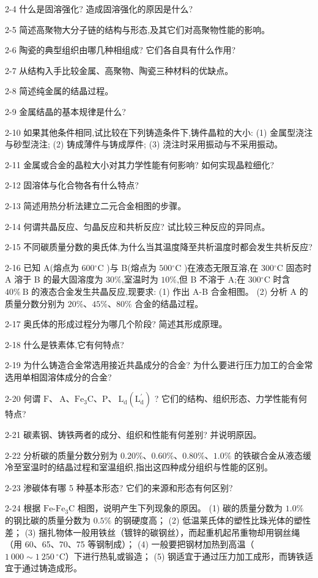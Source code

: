 \documentclass[UTF8]{ctexbook}
\newcommand{\◎}{\ensuremath{\bigcirc}}
\begin{document}
2-4 什么是固溶强化? 造成固溶强化的原因是什么?

2-5 简述高聚物大分子链的结构与形态,及其它们对高聚物性能的影响。

2-6 陶瓷的典型组织由哪几种相组成? 它们各自具有什么作用?

2-7 从结构入手比较金属、高聚物、陶瓷三种材料的优缺点。

2-8 简述纯金属的结晶过程。

2-9 金属结晶的基本规律是什么?

2-10 如果其他条件相同,试比较在下列铸造条件下,铸件晶粒的大小:
(1) 金属型浇注与砂型浇注;
(2) 铸成薄件与铸成厚件;
(3) 浇注时采用振动与不采用振动。

2-11 金属或合金的晶粒大小对其力学性能有何影响? 如何实现晶粒细化?

2-12 固溶体与化合物各有什么特点?

2-13 简述用热分析法建立二元合金相图的步骤。

2-14 何谓共晶反应、匀晶反应和共析反应? 试比较三种反应的异同点。

2-15 不同碳质量分数的奥氏体,为什么当其温度降至共析温度时都会发生共析反应?

2-16 已知 A(熔点为 $600{ }^{\circ} \mathrm{C}$ )与 B(熔点为 $500{ }^{\circ} \mathrm{C}$ )在液态无限互溶,在 $300{ }^{\circ} \mathrm{C}$ 固态时 A 溶于 B 的最大固溶度为 $30 \%$,室温时为 $10 \%$,但 B 不溶于 A;在 $300{ }^{\circ} \mathrm{C}$ 时含 $40 \% \mathrm{~B}$ 的液态合金发生共晶反应,现要求:
(1) 作出 A-B 合金相图。
(2) 分析 A 的质量分数分别为 $20 \% 、 45 \% 、 80 \%$ 合金的结晶过程。

2-17 奥氏体的形成过程分为哪几个阶段? 简述其形成原理。

2-18 什么是铁素体,它有何特点?

2-19 为什么铸造合金常选用接近共晶成分的合金? 为什么要进行压力加工的合金常选用单相固溶体成分的合金?

2-20 何谓 $\mathrm{F} 、 \mathrm{~A} 、 \mathrm{Fe}_{3} \mathrm{C} 、 \mathrm{P} 、 \mathrm{~L}_{\mathrm{d}}\left(\mathrm{L}_{\mathrm{d}}^{\prime}\right)$ ? 它们的结构、组织形态、力学性能有何特点?

2-21 碳素钢、铸铁两者的成分、组织和性能有何差别? 并说明原因。

2-22 分析碳的质量分数分别为 $0.20 \% 、 0.60 \% 、 0.80 \% 、 1.0 \%$ 的铁碳合金从液态缓冷至室温时的结晶过程和室温组织,指出这四种成分组织与性能的区别。

2-23 渗碳体有哪 5 种基本形态? 它们的来源和形态有何区别?

2-24 根据 $\text{Fe-Fe}_3\text{C}$ 相图，说明产生下列现象的原因。
(1) 碳的质量分数为 $1.0\%$ 的钢比碳的质量分数为 $0.5\%$ 的钢硬度高；
(2) 低温莱氏体的塑性比珠光体的塑性差；
(3) 捆扎物体一般用铁丝（镀锌的碳钢丝），而起重机起吊重物却用钢丝绳（用 60、65、70、75 等钢制成）；
(4) 一般要把钢材加热到高温（$1~000 \sim 1~250~^\circ\text{C}$）下进行热轧或锻造；
(5) 钢适宜于通过压力加工成形，而铸铁适宜于通过铸造成形。
\end{document}
